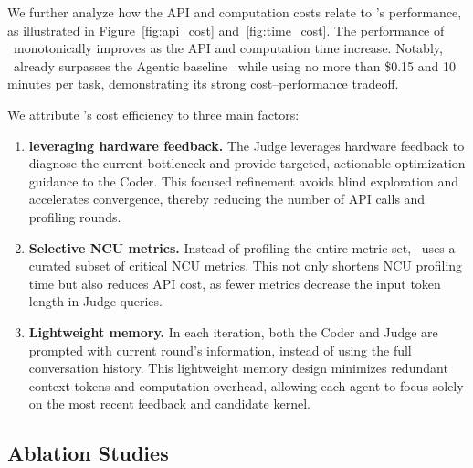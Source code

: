 We further analyze how the API and computation costs relate to \agentname's performance, as illustrated in Figure~\ref{fig:api_cost} and~\ref{fig:time_cost}. 
The performance of \agentname~monotonically improves as the API and computation time increase. 
Notably, \agentname~already surpasses the Agentic baseline~\citep{lange2025robustagenticcudakernel} while using no more than {\$0.15} and {10 minutes} per task, 
demonstrating its strong cost–performance tradeoff.

We attribute \agentname's cost efficiency to three main factors:
\begin{enumerate}
    \item \textbf{leveraging hardware feedback.}  
    The Judge leverages hardware feedback to diagnose the current bottleneck and provide targeted, actionable optimization guidance to the Coder. 
    This focused refinement avoids blind exploration and accelerates convergence, thereby reducing the number of API calls and profiling rounds.  

    \item \textbf{Selective NCU metrics.}  
    Instead of profiling the entire metric set, \agentname~uses a curated subset of critical NCU metrics. 
    This not only shortens NCU profiling time but also reduces API cost, as fewer metrics decrease the input token length in Judge queries. 
    \item \textbf{Lightweight memory.}
    In each iteration, both the Coder and Judge are prompted with current round's information, instead of using the full conversation history. 
    This lightweight memory design minimizes redundant context tokens and computation overhead, allowing each agent to focus solely on the most recent feedback and candidate kernel. 
\end{enumerate}




\subsection{Ablation Studies}
\label{ablation}
